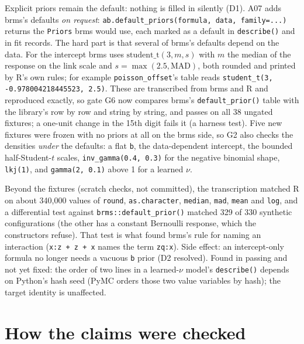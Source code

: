 \documentclass[11pt]{article}
\newcommand{\code}[1]{\texttt{#1}}
\begin{document}
Explicit priors remain the default: nothing is filled in silently (D1). A07 adds brms's defaults \emph{on request}:
\code{ab.default\_priors(formula, data, family=...)} returns the \code{Priors} brms would use, each marked as a default
in \code{describe()} and in fit records. The hard part is that several of brms's defaults depend on the data. For the
intercept brms uses $\text{student\_t}(3, m, s)$ with $m$ the median of the response on the link scale and
$s = \max(2.5, \text{MAD})$, both rounded and printed by R's own rules; for example \code{poisson\_offset}'s table reads
\code{student\_t(3, -0.978004218445523, 2.5)}. These are transcribed from brms and R and reproduced exactly, so gate G6
now compares brms's \code{default\_prior()} table with the library's row by row and string by string, and passes on
all 38 ungated fixtures; a one-unit change in the 15th digit fails it (a harness test). Five new fixtures were frozen
with no priors at all on the brms side, so G2 also checks the densities \emph{under} the defaults: a flat \code{b},
the data-dependent intercept, the bounded half-Student-$t$ scales, \code{inv\_gamma(0.4, 0.3)} for the negative
binomial shape, \code{lkj(1)}, and \code{gamma(2, 0.1)} above 1 for a learned $\nu$.

Beyond the fixtures (scratch checks, not committed), the transcription matched R on about 340{,}000 values of
\code{round}, \code{as.character}, \code{median}, \code{mad}, \code{mean} and \code{log}, and a differential test
against \code{brms::default\_prior()} matched 329 of 330 synthetic configurations (the other has a constant Bernoulli
response, which the constructors refuse). That test is what found brms's rule for naming an interaction
(\code{x:z + z + x} names the term \code{zq:x}). Side effect: an intercept-only formula no longer needs a vacuous
\code{b} prior (D2 resolved). Found in passing and not yet fixed: the order of two lines in a learned-$\nu$ model's
\code{describe()} depends on Python's hash seed (PyMC orders those two value variables by hash); the target identity
is unaffected.


\section{How the claims were checked}
\label{sec:verification}
\end{document}
